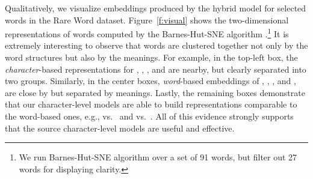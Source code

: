 Qualitatively, we visualize embeddings produced by the hybrid model \model{} for
selected words in the Rare Word dataset.
Figure~\ref{f:visual} shows the two-dimensional representations of words
computed by the
Barnes-Hut-SNE algorithm \cite{bhsne}.\footnote{We run Barnes-Hut-SNE algorithm
over a set of 91 words, but filter out 27 words for displaying clarity.} It is extremely interesting to observe that
words are clustered together not only by the word structures but also by
the meanings. For example, in the top-left box,
the {\it character}-based representations for , , , and  are nearby,
but clearly separated into two groups. Similarly, in the center boxes, {\it
word}-based embeddings of
, , , and , are
close by but separated by meanings. Lastly, the remaining boxes demonstrate that our
character-level models are able to build representations comparable to the
word-based ones, e.g.,  vs.\  and 
vs.\ . All of this evidence strongly supports that the source
character-level models are useful and effective.

